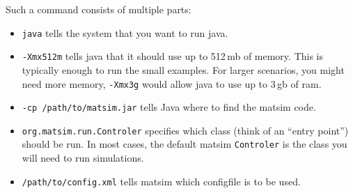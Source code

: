 Such a command consists of multiple parts:
\begin{itemize}\styleItemize
\item \lstinline|java| tells the system that you want to run \gls{java}.
\item \lstinline|-Xmx512m| tells \gls{java} that it should use up to 512\,\gls{mb} of memory. This is typically enough to run the small examples. For larger \glspl{scenario}, you might need more memory, \eg \lstinline|-Xmx3g| would allow \gls{java} to use up to 3\,\gls{gb} of \gls{ram}.
\item \lstinline|-cp /path/to/matsim.jar| tells Java where to find the \gls{matsim} code.
\item \lstinline|org.matsim.run.Controler| specifies which class (think of an ``entry point'') should be run. In most cases, the default \gls{matsim} \lstinline|Controler| is the class you will need to run simulations.
\item \lstinline|/path/to/config.xml| tells \gls{matsim} which \gls{configfile} is to be used. 
\end{itemize}

